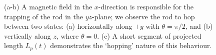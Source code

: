 \documentclass[aps,prl,twocolumn,superscriptaddress]{revtex4-1}
\begin{document}
\begin{figure}
\centering
{}
    \caption{\footnotesize (a-b) A magnetic field in the $x$-direction is responsible for the trapping of the rod in the $yz$-plane; we observe the rod to hop between two states: (a) horizontally along $\pm y$ with $\theta=\pi/2$, and (b) vertically along $z$, where $\theta=0$. (c) A short segment of projected length $L_p(t)$ demonstrates the `hopping' nature of this behaviour.}
\end{figure}
\end{document}
